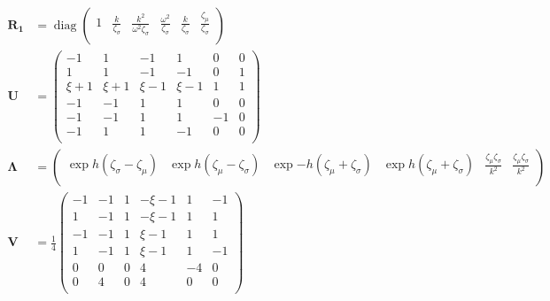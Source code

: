 \documentclass[a4paper,10pt]{article}
\DeclareMathOperator{\diag}{diag}
\begin{document}
\begin{align}
\mathbf{R_1}&=\diag\left(
\begin{array}{cccccc}
 1 & \frac{k}{\zeta _{\sigma }} &  \frac{k^2}{\omega ^2 \zeta _{\sigma }} &  \frac{\omega ^2}{\zeta _{\sigma }} &  \frac{k}{\zeta _{\sigma }} & \frac{\zeta _{\mu }}{\zeta _{\sigma }} \\
\end{array}
\right)\\
\mathbf{U}&=\left(
\begin{array}{cccccc}
 -1 & 1 & -1 & 1 & 0 & 0 \\
 1 & 1 & -1 & -1 & 0 & 1 \\
 \xi +1 & \xi +1 & \xi -1 & \xi -1 & 1 & 1 \\
 -1 & -1 & 1 & 1 & 0 & 0 \\
 -1 & -1 & 1 & 1 & -1 & 0 \\
 -1 & 1 & 1 & -1 & 0 & 0 \\
\end{array}
\right)\\
\boldsymbol{\Lambda}&=\left(
\begin{array}{cccccc}
 \exp{h \left(\zeta _{\sigma }-\zeta _{\mu }\right)} & \exp{h \left(\zeta _{\mu }-\zeta _{\sigma }\right)} & \exp{-h
   \left(\zeta _{\mu }+\zeta _{\sigma }\right)} & \exp{h \left(\zeta _{\mu }+\zeta _{\sigma }\right)} & \frac{\zeta
   _{\mu } \zeta _{\sigma }}{k^2} & \frac{\zeta _{\mu } \zeta _{\sigma }}{k^2} \\
\end{array}
\right)\\
\mathbf{V}&=\frac{1}{4}\left(
\begin{array}{cccccc}
 -1 & -1 & 1 & -\xi -1 & 1 & -1 \\
 1 & -1 & 1 & -\xi -1 & 1 & 1 \\
 -1 & -1 & 1 & \xi -1 & 1 & 1 \\
 1 & -1 & 1 & \xi -1 & 1 & -1 \\
 0 & 0 & 0 & 4 & -4 & 0 \\
 0 & 4 & 0 & 4 & 0 & 0 \\
\end{array}
\right)\\

\end{align}
\end{document}
